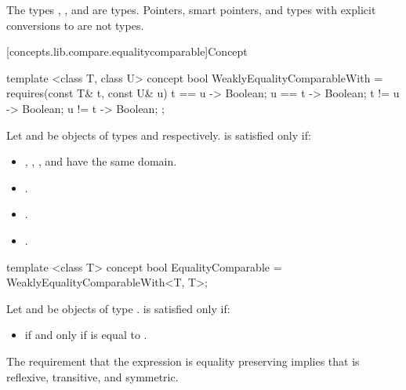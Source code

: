 \pnum \enterexample The types , , and
 are  types.
Pointers, smart pointers, and types with explicit conversions to  are
not  types.\exitexample

[concepts.lib.compare.equalitycomparable]{Concept }

%
\begin{itemdecl}
template <class T, class U>
concept bool WeaklyEqualityComparableWith =
  requires(const T& t, const U& u) {
    { t == u } -> Boolean;
    { u == t } -> Boolean;
    { t != u } -> Boolean;
    { u != t } -> Boolean;
  };
\end{itemdecl}

\begin{itemdescr}
\pnum
Let  and  be objects of types  and  respectively.
 is satisfied only if:
\begin{itemize}
\item {}, , , and 
      have the same domain.
\item {}.
\item {}.
\item {}.
\end{itemize}
\end{itemdescr}

%
\begin{itemdecl}
template <class T>
concept bool EqualityComparable = WeaklyEqualityComparableWith<T, T>;
\end{itemdecl}

\begin{itemdescr}
\pnum
Let  and  be objects of type .
 is satisfied only if:

\begin{itemize}
\item {} if and only if  is equal to .
\end{itemize}

\pnum
\enternote The requirement that the expression  is equality preserving
implies that \tcode{==} is reflexive, transitive, and symmetric.\exitnote
\end{itemdescr}

